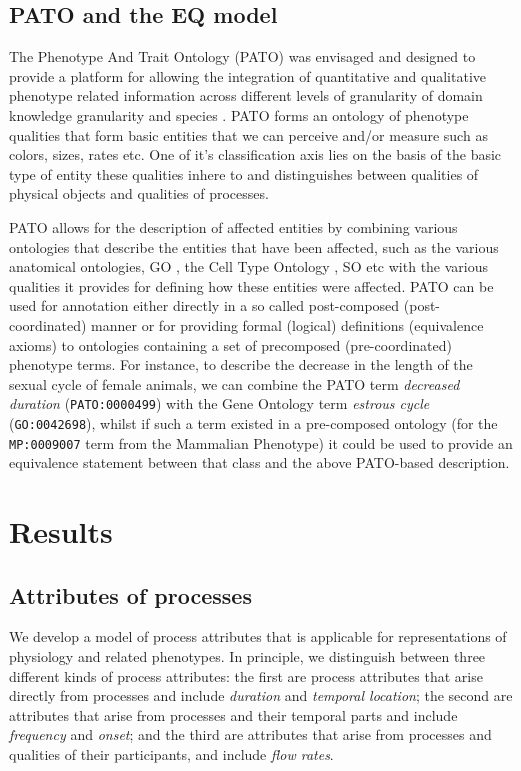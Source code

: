 \documentclass{bioinfo}
\renewcommand{\cite}{\citep}
\begin{document}
\subsection{PATO and the EQ model}
The Phenotype And Trait Ontology (PATO) was envisaged and designed to
provide a platform for allowing the integration of quantitative and
qualitative phenotype related information across different levels of
granularity of domain knowledge granularity and species
\cite{Gkoutos2005}.  PATO forms an ontology of phenotype qualities
that form basic entities that we can perceive and/or measure such as
colors, sizes, rates etc. One of it's classification axis lies on the
basis of the basic type of entity these qualities inhere to and
distinguishes between qualities of physical objects and qualities of
processes.

PATO allows for the description of affected entities by combining
various ontologies that describe the entities that have been affected,
such as the various anatomical ontologies, GO \cite {Ashburner2000b},
the Cell Type Ontology \cite {Bard2005}, SO \cite {Eilbeck2005} etc
with the various qualities it provides for defining how these entities
were affected.  PATO can be used for annotation either directly in a
so called post-composed (post-coordinated) manner or for providing
formal (logical) definitions (equivalence axioms) to ontologies
containing a set of precomposed (pre-coordinated) phenotype terms. For
instance, to describe the decrease in the length of the sexual cycle
of female animals, we can combine the PATO term \textit{decreased
  duration} ({\tt PATO:0000499}) with the Gene Ontology term
\textit{estrous cycle} ({\tt GO:0042698}), whilst if such a term
existed in a pre-composed ontology (for the {\tt MP:0009007} term from
the Mammalian Phenotype) it could be used to provide an equivalence
statement between that class and the above PATO-based description.

\section{Results}
\subsection{Attributes of processes}
We develop a model of process attributes that is applicable for
representations of physiology and related phenotypes. In principle, we
distinguish between three different kinds of process attributes: the
first are process attributes that arise directly from processes and
include {\em duration} and {\em temporal location}; the second are
attributes that arise from processes and their temporal parts and
include {\em frequency} and {\em onset}; and the third are attributes
that arise from processes and qualities of their participants, and
include {\em flow rates}.
\end{document}
